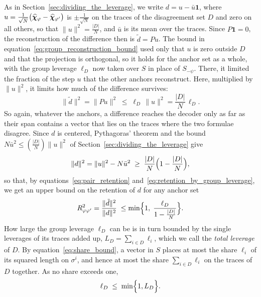 \documentclass[titlepage,a4paper,11pt]{report}
\begin{document}
    As in Section~\ref{sec:dividing_the_leverage}, we write $d=u-\bar u\mathbf{1}$, where $u=\frac{1}{\sqrt N}\bigl(\satvec_\phi-\satvec_{\phi'}\bigr)$ is $\pm\frac{1}{\sqrt N}$ on the traces of the disagreement set $D$ and zero on all others, so that $\lVert u\rVert^2=\frac{|D|}{N}$, and $\bar u$ is its mean over the traces. Since $P\mathbf{1}=0$, the reconstruction of the difference then is $\tilde d=Pu$. The bound in equation~\eqref{eq:group_reconstruction_bound} used only that $u$ is zero outside $D$ and that the projection is orthogonal, so it holds for the anchor set as a whole, with the group leverage $\ell_D$ now taken over $S$ in place of $S_{-\psi}$. There, it limited the fraction of the step $u$ that the other anchors reconstruct. Here, multiplied by $\lVert u\rVert^2$, it limits how much of the difference survives:
    \begin{equation}\label{eq:retention_by_group_leverage}
        \lVert\tilde d\rVert^2=\lVert Pu\rVert^2\;\le\;\ell_D\,\lVert u\rVert^2=\frac{|D|}{N}\,\ell_D .
    \end{equation}
    So again, whatever the anchors, a difference reaches the decoder only as far as their span contains a vector that lies on the traces where the two formulae disagree. Since $d$ is centered, Pythagoras' theorem and the bound $N\bar u^2\le(\frac{|D|}{N})\lVert u\rVert^2$ of Section~\ref{sec:dividing_the_leverage} give
    \begin{equation}
        \lVert d\rVert^2=\lVert u\rVert^2-N\bar u^2\;\ge\;\frac{|D|}{N}\Bigl(1-\frac{|D|}{N}\Bigr),
    \end{equation}
    so that, by equations~\eqref{eq:pair_retention} and~\eqref{eq:retention_by_group_leverage}, we get an upper bound on the retention of $d$ for any anchor set
    \begin{equation}\label{eq:retention_ceiling}
        R^2_{\phi\phi'}=\frac{\lVert \tilde d\rVert^2}{\lVert d\rVert^2}\;\le\min\Bigl\{1,\;\frac{\ell_D}{1-\frac{|D|}{N}}\Bigr\}.
    \end{equation}
    How large the group leverage $\ell_D$ can be is in turn bounded by the single leverages of its traces added up, $L_D = \sum_{i\in D}\ell_i$, which we call the \emph{total leverage} of $D$. By equation~\eqref{eq:share_bound}, a vector in $S$ places at most the share $\ell_i$ of its squared length on $\sigma^i$, and hence at most the share $\sum_{i\in D}\ell_i$ on the traces of $D$ together. As no share exceeds one,
    \begin{equation}\label{eq:group_leverage_ceiling}
        \ell_D\;\le\;\min\Bigl\{1,L_D\Bigr\}.
    \end{equation}
\end{document}
